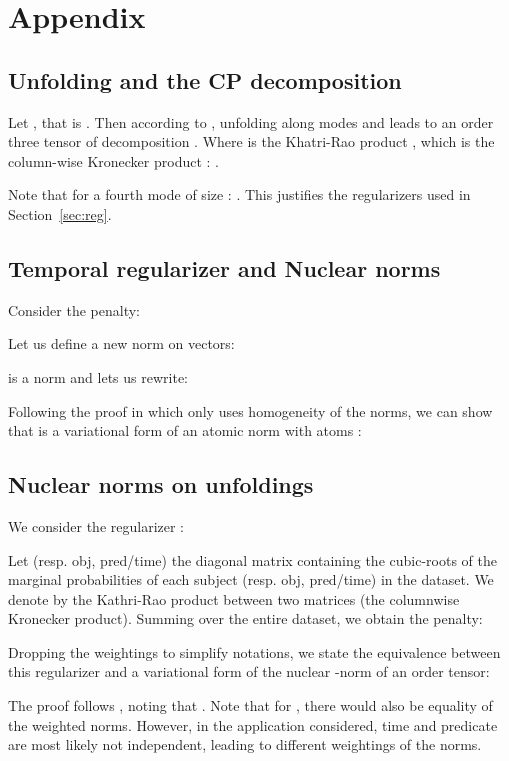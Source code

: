 \documentclass{article}
\begin{document}
\section{Appendix}
\subsection{Unfolding and the CP decomposition}
\label{app:unfolding}
Let , that is . Then according to \citet{kolda_tensor_2009}, unfolding along modes  and  leads to an order three tensor of decomposition . Where  is the Khatri-Rao product \citep{smilde2005multi}, which is the column-wise Kronecker product : .

Note that for a fourth mode of size : . This justifies the regularizers used in Section~\ref{sec:reg}.

\subsection{Temporal regularizer and Nuclear norms}
\label{app:temporal_nuclear}
Consider the penalty:

Let us define a new norm on vectors:

 is a norm and lets us rewrite:

Following the proof in \citet{lacroix2018canonical} which only uses homogeneity of the norms, we can show that  is a variational form of an atomic norm with atoms :


\subsection{Nuclear norms on unfoldings}
\label{app:n3_for_4}
We consider the regularizer :

Let  (resp. obj, pred/time) the diagonal matrix containing the cubic-roots of the marginal probabilities of each subject (resp. obj, pred/time) in the dataset. We denote by  the Kathri-Rao product between two matrices (the columnwise Kronecker product). Summing over the entire dataset, we obtain the penalty:


Dropping the weightings to simplify notations, we state the equivalence between this regularizer and a variational form of the nuclear -norm of an order  tensor:


The proof follows \citet{lacroix2018canonical}, noting that . Note that for , there would also be equality of the weighted norms. However, in the application considered, time and predicate are most likely not independent, leading to different weightings of the norms.
\newpage
\end{document}
